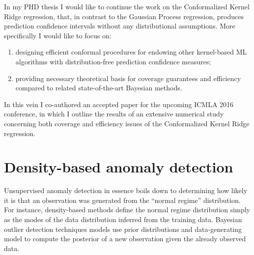 \documentclass{extarticle}
\begin{document}
In my PHD thesis I would like to continue the work on the Conformalized Kernel Ridge
regression, that, in contrast to the Gaussian Process regression, produces prediction
confidence intervals without any distributional assumptions. More specifically I
would like to focus on: \begin{enumerate}
  \item designing efficient conformal procedures for endowing other kernel-based
  ML algorithms with distribution-free prediction confidence measures;
  \item providing necessary theoretical basis for coverage guarantees and efficiency
  compared to related state-of-the-art Bayesian methods.
\end{enumerate}

In this vein I co-authored an accepted paper for the upcoming ICMLA 2016 conference,
in which I outline the results of an extensive numerical study concerning both coverage
and efficiency issues of the Conformalized Kernel Ridge regression.


\section{Density-based anomaly detection} %
\label{sec:density_based_anomaly_detection}


Unsupervised anomaly detection in essence boils down to determining how likely it
is that an observation was generated from the ``normal regime'' distribution. For
instance, density-based methods define the normal regime distribution simply as
the modes of the data distribution inferred from the training data. Bayesian outlier
detection techniques models use prior distributions and data-generating model to
compute the posterior of a new observation given the already observed data.
\end{document}
